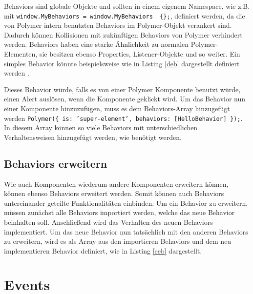 Behaviors sind globale Objekte und sollten in einem eigenem Namespace, wie z.B. mit \texttt{window.MyBehaviors\ =\ window.MyBehaviors\ \textbar{}\textbar{}\ \{\};}, definiert werden, da die von Polymer intern benutzten Behaviors im
Polymer-Objekt verankert sind. Dadurch können Kollisionen mit zukünftigen Behaviors von Polymer verhindert werden. Behaviors haben eine starke Ähnlichkeit zu normalen Polymer-Elementen, sie besitzen ebenso Properties, Listener-Objekte und so weiter. Ein simples Behavior könnte beispielsweise wie in Listing \ref{deb} dargestellt definiert werden \cite{citeulike:13915079}.



Dieses Behavior würde, falls es von einer Polymer Komponente benutzt würde, einen Alert auslösen, wenn die Komponente geklickt wird. Um das Behavior nun einer Komponente hinzuzufügen, muss es dem Behaviors-Array hinzugefügt werden \texttt{Polymer(\{\ is:\ 'super-element',\ behaviors:\ {[}HelloBehavior{]}\ \});}. In diesem Array können so viele Behaviors mit unterschiedlichen Verhaltensweisen hinzugefügt werden, wie benötigt werden.


\subsection{Behaviors erweitern}\label{behaviors-erweitern}

Wie auch Komponenten wiederum andere Komponenten erweitern können, können ebenso Behaviors erweitert werden. Somit können auch Behaviors untereinander geteilte Funktionalitäten einbinden. Um ein Behavior zu erweitern, müssen zunächst alle Behaviors importiert werden, welche das neue Behavior beinhalten soll. Anschließend wird das Verhalten des neuen Behaviors implementiert. Um das neue Behavior nun tatsächlich mit den anderen Behaviors zu erweitern, wird es als Array aus den importieren Behaviors und dem neu implementieren Behavior definiert, wie in Listing \ref{eeb} dargestellt.




\section{Events}\label{events}

